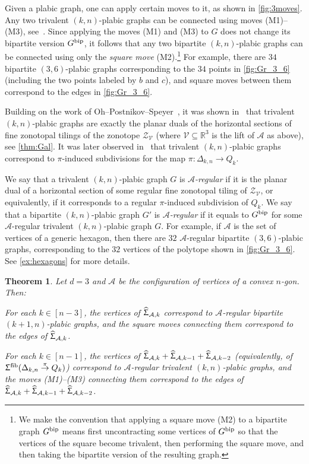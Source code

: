 \documentclass[11pt]{amsart}
\theoremstyle{plain}
\newtheorem{theorem}{Theorem}[section]
\theoremstyle{definition}
\def\R{\mathbb{R}}
\def\A{\mathcal{A}}
\def\V{\mathcal{V}}
\def\Zon{\mathcal{Z}}
\def\ZV{\Zon_\V}
\def\HSP{\widehat\Upsigma}
\def\Sigma{\HSP}
\def\fiber{{\operatorname{fib}}}
\def\FibPoly{\Upsigma^\fiber}
\def\pito{\overset \pi \to}
\def\VC{\V}
\let\subset\subseteq
\begin{document}
Given a plabic graph, one can apply certain moves to it,
as shown in \cref{fig:3moves}. Any two trivalent $(k,n)$-plabic graphs can be connected using moves (M1)--(M3), see~\cite[Theorem~13.4]{Pos06}. Since applying the moves (M1) and (M3) to $G$ does not change its bipartite version $G^{{\operatorname{bip}}}$, it follows that any two bipartite $(k,n)$-plabic graphs can be connected using only the \emph{square move} (M2).\footnote{We make the convention that applying a square move (M2) to a bipartite graph $G^{{\operatorname{bip}}}$ means first uncontracting some vertices of $G^{{\operatorname{bip}}}$ so that the vertices of the square become trivalent, then performing the square move, and then taking the bipartite version of the resulting graph.}
For example, there are $34$ bipartite $(3,6)$-plabic graphs corresponding to the $34$ points in \cref{fig:Gr_3_6} (including the two points labeled by $b$ and $c$), and square moves between them correspond to the edges in \cref{fig:Gr_3_6}.

Building on the work of Oh--Postnikov--Speyer~\cite{OPS}, it was shown in~\cite{Gal} that trivalent $(k,n)$-plabic graphs are exactly the 
planar duals of the  horizontal sections of fine zonotopal tilings of 
the zonotope $\ZV$ (where $\VC\subset \R^3$ is the lift of $\A$ as above), see \cref{thm:Gal}.
It was later observed in~\cite{PosICM} that trivalent $(k,n)$-plabic graphs correspond to $\pi$-induced subdivisions for the map $\pi:\Delta_{k,n}\to Q_k$.

 We say that a trivalent $(k,n)$-plabic graph $G$ is \emph{$\A$-regular} if it is the planar dual of a horizontal section of some regular fine zonotopal tiling of $\ZV$, or equivalently, if it corresponds to a regular $\pi$-induced subdivision of $Q_k$. We say that a bipartite $(k,n)$-plabic graph $G'$ is \emph{$\A$-regular} if it equals to $G^{{\operatorname{bip}}}$ for some $\A$-regular trivalent $(k,n)$-plabic graph $G$. For example, if $\A$ is the set of vertices of a generic hexagon, then there are $32$ $\A$-regular bipartite $(3,6)$-plabic graphs, corresponding to the $32$ vertices of the polytope shown in \cref{fig:Gr_3_6}. See \cref{ex:hexagons} for more details.




\begin{theorem}\label{thm:regular}
Let $d=3$ and $\A$ be the configuration of vertices of
a convex $n$-gon.  Then:
\begin{theoremlist}
\item\label{thm:regular_bip} For each $k\in[n-3]$, the vertices of $\Sigma_{\A, k}$  correspond
to $\A$-regular \emph{bipartite} $(k+1,n)$-plabic graphs, and the square moves connecting them correspond to the edges of $\Sigma_{\A,k}$.
\item\label{thm:regular_triv}  For each $k\in[n-1]$, the vertices of $\Sigma_{\A, k}+\Sigma_{\A, k-1} + \Sigma_{\A, k-2}$ (equivalently, of $\FibPoly(\Delta_{k,n}\pito Q_k)$) correspond to $\A$-regular \emph{trivalent} $(k,n)$-plabic graphs, and the moves (M1)--(M3) connecting them correspond to the edges of 
	$\Sigma_{\A, k}+\Sigma_{\A, k-1} + \Sigma_{\A, k-2}$.
\end{theoremlist}
\end{theorem}
\end{document}
